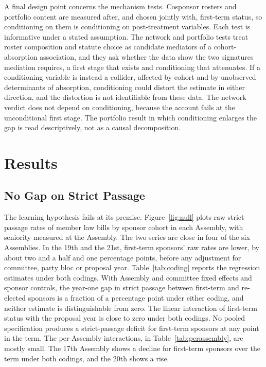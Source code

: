 \documentclass[11pt]{article}
\begin{document}
A final design point concerns the mechanism tests. Cosponsor rosters and portfolio content are measured after, and chosen jointly with, first-term status, so conditioning on them is conditioning on post-treatment variables. Each test is informative under a stated assumption. The network and portfolio tests treat roster composition and statute choice as candidate mediators of a cohort-absorption association, and they ask whether the data show the two signatures mediation requires, a first stage that exists and conditioning that attenuates. If a conditioning variable is instead a collider, affected by cohort and by unobserved determinants of absorption, conditioning could distort the estimate in either direction, and the distortion is not identifiable from these data. The network verdict does not depend on conditioning, because the account fails at the unconditional first stage. The portfolio result in which conditioning enlarges the gap is read descriptively, not as a causal decomposition.

\section{Results}

\subsection{No Gap on Strict Passage}

The learning hypothesis fails at its premise. Figure~\ref{fig:null} plots raw strict passage rates of member law bills by sponsor cohort in each Assembly, with seniority measured at the Assembly. The two series are close in four of the six Assemblies. In the 19th and the 21st, first-term sponsors' raw rates are lower, by about two and a half and one percentage points, before any adjustment for committee, party bloc or proposal year. Table~\ref{tab:coding} reports the regression estimates under both codings. With Assembly and committee fixed effects and sponsor controls, the year-one gap in strict passage between first-term and re-elected sponsors is a fraction of a percentage point under either coding, and neither estimate is distinguishable from zero. The linear interaction of first-term status with the proposal year is close to zero under both codings. No pooled specification produces a strict-passage deficit for first-term sponsors at any point in the term. The per-Assembly interactions, in Table~\ref{tab:perassembly}, are mostly small. The 17th Assembly shows a decline for first-term sponsors over the term under both codings, and the 20th shows a rise.
\end{document}

